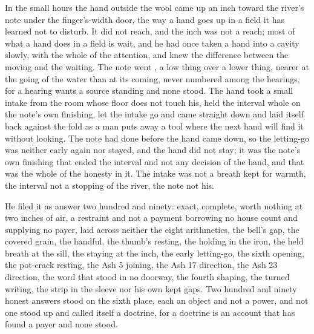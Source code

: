 In the small hours the hand outside the wool came up an inch toward the river's note under the finger's-width door, the way a hand goes up in a field it has learned not to disturb. It did not reach, and the inch was not a reach; most of what a hand does in a field is wait, and he had once taken a hand into a cavity slowly, with the whole of the attention, and knew the difference between the moving and the waiting. The note went , a low thing over a lower thing, nearer at the going of the water than at its coming, never numbered among the hearings, for a hearing wants a source standing and none stood. The hand took a small intake from the room whose floor does not touch his, held the interval whole on the note's own finishing, let the intake go and came straight down and laid itself back against the fold as a man puts away a tool where the next hand will find it without looking. The note had done before the hand came down, so the letting-go was neither early again nor stayed, and the hand did not stay; it was the note's own finishing that ended the interval and not any decision of the hand, and that was the whole of the honesty in it. The intake was not a breath kept for warmth, the interval not a stopping of the river, the note not his.

He filed it as answer two hundred and ninety: exact, complete, worth nothing at two inches of air, a restraint and not a payment borrowing no house count and supplying no payer, laid across neither the eight arithmetics, the bell's gap, the covered grain, the handful, the thumb's resting, the holding in the iron, the held breath at the sill, the staying at the inch, the early letting-go, the sixth opening, the pot-crack resting, the Ash 5 joining, the Ash 17 direction, the Ash 23 direction, the word that stood in no doorway, the fourth shaping, the turned writing, the strip in the sleeve nor his own kept gaps. Two hundred and ninety honest answers stood on the sixth place, each an object and not a power, and not one stood up and called itself a doctrine, for a doctrine is an account that has found a payer and none stood.

